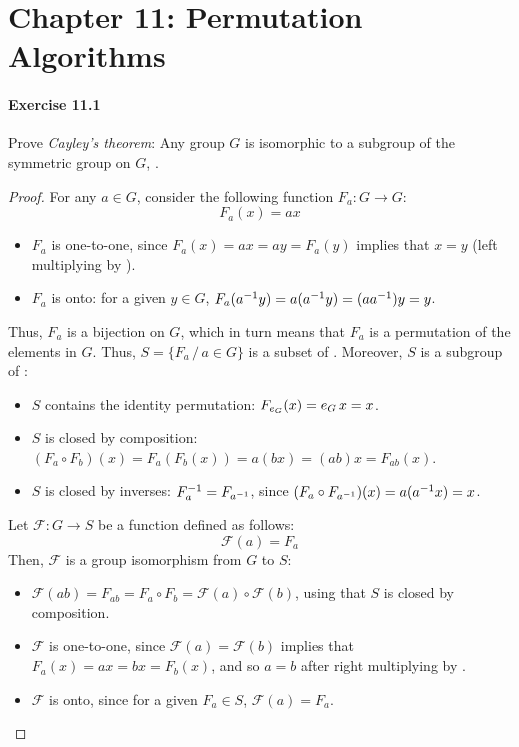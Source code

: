 \section*{Chapter 11: Permutation Algorithms}

\paragraph{Exercise 11.1}
Prove \textsl{Cayley's theorem}: Any group $G$ is isomorphic to a subgroup of
the symmetric group on $G$, .

\begin{proof}

For any $a \in G$, consider the following function $F_a: G \rightarrow G$:
$$F_a(x) = a x$$
\begin{itemize}
    \item $F_a$ is one-to-one, since $F_a(x) = a x = a y = F_a(y)$ implies 
    that $x = y$ (left multiplying by ).
    \item $F_a$ is onto: for a given $y \in G$, $F_a(a^{-1} y) = a (a^{-1} y)
    = (a a^{-1}) y = y$.
\end{itemize}
Thus, $F_a$ is a bijection on $G$, which in turn means that $F_a$ is a permutation
of the elements in $G$. Thus, $S = \{ F_a \, / \, a \in G \}$ is a subset of .
Moreover, $S$ is a subgroup of :
\begin{itemize}
    \item $S$ contains the identity permutation: $F_{e_{G}}(x) = e_{G} \, x = x$.
    \item $S$ is closed by composition: $(F_a \circ F_b)(x) = F_a(F_b(x)) = a (b x)
    = (a b) x = F_{ab}(x)$.
    \item $S$ is closed by inverses: $F_a^{-1} = F_{a^{-1}}$, since
    $(F_a \circ F_{a^{-1}})(x) = a (a^{-1} x) = x$.
\end{itemize}
Let $\mathcal{F} : G \rightarrow S$  be a function defined as follows:
$$\mathcal{F}(a) = F_a$$
Then, $\mathcal{F}$ is a group isomorphism from $G$ to $S$:
\begin{itemize}
    \item $\mathcal{F}(ab) = F_{ab} = F_a \circ F_b =
    \mathcal{F}(a) \circ \mathcal{F}(b)$, using that $S$ is closed by composition.
    \item $\mathcal{F}$ is one-to-one, since $\mathcal{F}(a) = \mathcal{F}(b)$
    implies that $F_a(x) = a x = b x = F_b(x)$, and so $a = b$ after right
    multiplying by .
    \item $\mathcal{F}$ is onto, since for a given $F_a \in S$, $\mathcal{F}(a) = F_a$.
\end{itemize}
\end{proof}
